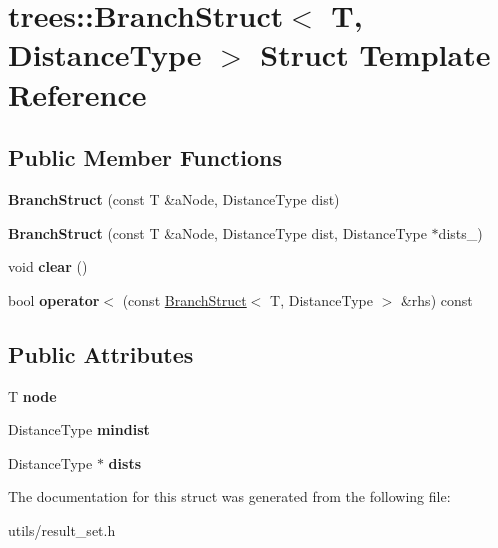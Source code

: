 \hypertarget{structtrees_1_1_branch_struct}{}\section{trees\+:\+:Branch\+Struct$<$ T, Distance\+Type $>$ Struct Template Reference}
\label{structtrees_1_1_branch_struct}
\subsection*{Public Member Functions}
\begin{DoxyCompactItemize}
\item 
\mbox{\label{structtrees_1_1_branch_struct_a7f2c8a75382a0b48aa8342ed65fb0b19}} 
{\bfseries Branch\+Struct} (const T \&a\+Node, Distance\+Type dist)
\item 
\mbox{\label{structtrees_1_1_branch_struct_aaf0c81accb385dee2560d1157eac9a5e}} 
{\bfseries Branch\+Struct} (const T \&a\+Node, Distance\+Type dist, Distance\+Type $\ast$dists\+\_\+)
\item 
\mbox{\label{structtrees_1_1_branch_struct_a09ce496507ee30a910bcda1d4c65ab89}} 
void {\bfseries clear} ()
\item 
\mbox{\label{structtrees_1_1_branch_struct_a760336c1aab5e59227bfdbe0e6a56462}} 
bool {\bfseries operator$<$} (const \hyperlink{structtrees_1_1_branch_struct}{Branch\+Struct}$<$ T, Distance\+Type $>$ \&rhs) const
\end{DoxyCompactItemize}
\subsection*{Public Attributes}
\begin{DoxyCompactItemize}
\item 
\mbox{\label{structtrees_1_1_branch_struct_a1bd0cc2136455fb1da2c7cb00bb575ed}} 
T {\bfseries node}
\item 
\mbox{\label{structtrees_1_1_branch_struct_a94935ab23accd67809ddf383357731dc}} 
Distance\+Type {\bfseries mindist}
\item 
\mbox{\label{structtrees_1_1_branch_struct_a07d1fdf824f99318047b219118ebb250}} 
Distance\+Type $\ast$ {\bfseries dists}
\end{DoxyCompactItemize}


The documentation for this struct was generated from the following file\+:\begin{DoxyCompactItemize}
\item 
utils/result\+\_\+set.\+h\end{DoxyCompactItemize}
